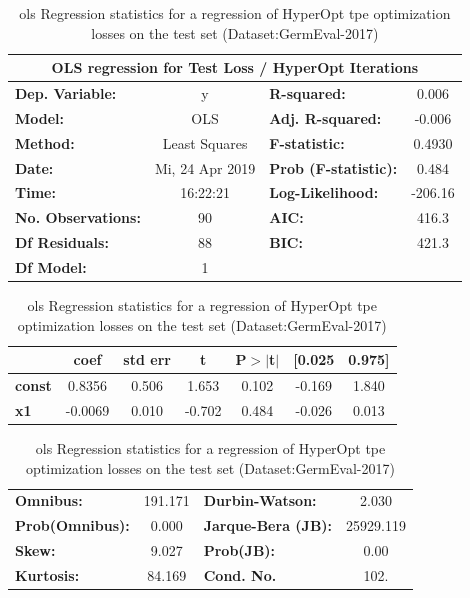 \begin{table}[H]
	\begin{center}
		\begin{tabular}{lclc}
		\toprule
		\multicolumn{4}{c}{OLS regression for Test Loss / HyperOpt Iterations} \\
		\midrule
		\textbf{Dep. Variable:}    &        y        & \textbf{  R-squared:        } &     0.006   \\
		\textbf{Model:}            &       OLS       & \textbf{  Adj. R-squared:   } &    -0.006   \\
		\textbf{Method:}           &  Least Squares  & \textbf{  F-statistic:      } &    0.4930   \\
		\textbf{Date:}             & Mi, 24 Apr 2019 & \textbf{  Prob (F-statistic):} &    0.484    \\
		\textbf{Time:}             &     16:22:21    & \textbf{  Log-Likelihood:   } &   -206.16   \\
		\textbf{No. Observations:} &          90     & \textbf{  AIC:              } &     416.3   \\
		\textbf{Df Residuals:}     &          88     & \textbf{  BIC:              } &     421.3   \\
		\textbf{Df Model:}         &           1     & \textbf{                     } &             \\
		\bottomrule
		\end{tabular}
		\begin{tabular}{lcccccc}
					& \textbf{coef} & \textbf{std err} & \textbf{t} & \textbf{P$>$$|$t$|$} & \textbf{[0.025} & \textbf{0.975]}  \\
		\midrule
		\textbf{const} &       0.8356  &        0.506     &     1.653  &         0.102        &       -0.169    &        1.840     \\
		\textbf{x1}    &      -0.0069  &        0.010     &    -0.702  &         0.484        &       -0.026    &        0.013     \\
		\bottomrule
		\end{tabular}
		\begin{tabular}{lclc}
		\textbf{Omnibus:}       & 191.171 & \textbf{  Durbin-Watson:    } &     2.030  \\
		\textbf{Prob(Omnibus):} &   0.000 & \textbf{  Jarque-Bera (JB): } & 25929.119  \\
		\textbf{Skew:}          &   9.027 & \textbf{  Prob(JB):         } &      0.00  \\
		\textbf{Kurtosis:}      &  84.169 & \textbf{  Cond. No.          } &      102.  \\
		\bottomrule
		\end{tabular}
	\end{center}
	\caption{\gls{ols} Regression statistics for a regression of HyperOpt \gls{tpe} optimization losses on the test set {(Dataset:GermEval-2017)}}
	\label{tab:08_olsLossItTest}	
\end{table}

